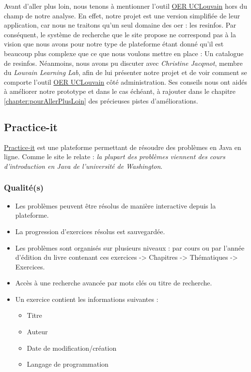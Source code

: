 Avant d'aller plus loin, nous tenons à mentionner l'outil \href{https://oer.uclouvain.be/}{OER UCLouvain} hors du champ de notre analyse. En effet, notre projet est une version simplifiée de leur application, car nous ne traitons qu'un seul domaine des \gls{oer} : les \glspl{resinfo}. Par conséquent, le système de recherche que le site propose ne correspond pas à la vision que nous avons pour notre type de plateforme étant donné qu'il est beaucoup plus complexe que ce que nous voulons mettre en place : Un catalogue de \glspl{resinfo}. Néanmoins, nous avons pu discuter avec \textit{Christine Jacqmot}, membre du \textit{Louvain Learning Lab}, afin de lui présenter notre projet et de voir comment se comporte l'outil \href{https://oer.uclouvain.be/}{OER UCLouvain} côté administration. Ses conseils nous ont aidés à améliorer notre prototype et dans le cas échéant, à rajouter dans le chapitre \ref{chapter:pourAllerPlusLoin} des précieuses pistes d'améliorations.
\pagebreak
\subsection*{Practice-it}

\href{https://practiceit.cs.washington.edu/problem/list}{Practice-it} est une plateforme permettant de résoudre des problèmes en Java en ligne. Comme le site le relate : \textit{la plupart des problèmes viennent des cours d'introduction en Java de l'université de Washington}.

\subsubsection*{Qualité(s)}

\begin{itemize}
    \item Les problèmes peuvent être résolus de manière interactive depuis la plateforme.
    \item La progression d'exercices résolus est sauvegardée.
    \item Les problèmes sont organisés sur plusieurs niveaux : par cours ou par l'année d'édition du livre contenant ces exercices -> Chapitres -> Thématiques -> Exercices.
    \item Accès à une recherche avancée par mots clés ou titre de recherche.
    \item Un exercice contient les informations suivantes :
    \begin{itemize}
        \item Titre
        \item Auteur
        \item Date de modification/création
        \item Langage de programmation
    \end{itemize}
\end{itemize}

